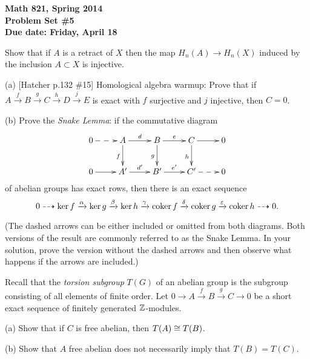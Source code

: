 
\usepackage{youngtab}

\thispagestyle{empty}
{\bf Math 821, Spring 2014\\
Problem Set \#5\\
Due date: Friday, April 18}

\prob [Hatcher p.131 \#11] Show that if $A$ is a retract of $X$
then the map $H_n(A)\to H_n(X)$ induced by the inclusion $A\subset X$ is
injective.

\prob (a) [Hatcher p.132 \#15] Homological algebra warmup: Prove that if $A\xrightarrow{f}B\xrightarrow{g}C\xrightarrow{h}D\xrightarrow{j}E$ is exact with $f$ surjective and $j$ injective, then $C=0$.

(b) Prove the \emph{Snake Lemma}: if the commutative diagram
\[\xymatrix{
0\ar@{-->}[r] & A\rto^d\dto_f & B\rto^e\dto_g & C\rto\dto_h & 0\\
0\rto & A'\rto^{d'} & B'\rto^{e'} & C'\ar@{-->}[r] & 0
}\]
of abelian groups has exact rows, then there is an exact sequence
\[0\dashrightarrow \ker f\xrightarrow{\alpha} \ker g\xrightarrow{\beta}
  \ker h\xrightarrow{\gamma} \operatorname{coker} f\xrightarrow{\delta}
 \operatorname{coker} g\xrightarrow{\varepsilon}\operatorname{coker} h\dashrightarrow 0.\]

(The dashed arrows can be either included or omitted from both
 diagrams.  Both versions of the result are commonly referred to as
 the Snake Lemma.  In your solution, prove the version without the
 dashed arrows and then observe what happens if the arrows are
 included.)


\prob Recall that the \emph{torsion subgroup} $T(G)$ of an abelian group is the subgroup consisting of all elements of finite order.  Let $0\to A\xrightarrow{f} B\xrightarrow{g} C\to 0$ be a short exact sequence of finitely generated $\mathbb{Z}$-modules.

(a) Show that if $C$ is free abelian, then $T(A)\cong T(B)$.

(b) Show that $A$ free abelian does not necessarily imply that $T(B)=T(C)$.

\bigskip

\bigskip


